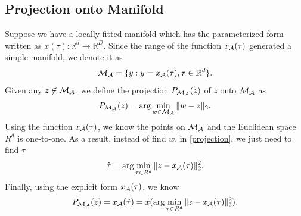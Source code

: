\documentclass[aos,preprint]{imsart}
\theoremstyle{remark}
\begin{document}
\subsection{Projection onto Manifold}
Suppose we have a locally fitted manifold which has the parameterized form written as $x(\tau): {\mathbb R}^d\rightarrow {\mathbb R}^D$.
Since the range of the function $x_{\cal A}(\tau)$ generated a simple manifold, we denote it as 
\[
{\cal M}_{\cal A} = \{y: y = x_{\cal A}(\tau), \tau\in {\mathbb R}^d\}.
\]
Given any $z\not\in{\cal M}_{\cal A}$, we define the projection $P_{{\cal M}_{\cal A}}(z)$  of $z$ onto ${\cal M}_{\cal A}$ as
\begin{equation}\label{projection}
P_{{\cal M}_{\cal A}}(z) = \arg\min_{w \in {\cal M}_{\cal A} }\|w-z\|_2.
\end{equation}
Using the function $x_{\cal A}(\tau)$, we know the points on ${\cal M}_{\cal A}$ and the Euclidean space $R^d$ is one-to-one. As a result, instead of find $w$, in \eqref{projection}, we just need to find $\tau$
\begin{equation}\label{projection_tau}
 \hat{\tau} = \arg\min_{\tau\in R^d }\|z-x_{\cal A}(\tau)\|_2^2.
\end{equation}
Finally, using the explicit form $x_{\cal A}(\tau)$, we know
\[
P_{{\cal M}_{\cal A}}(z) = x_{\cal A}(\hat{\tau})=x(\arg\min_{\tau\in R^d }\|z-x_{\cal A}(\tau)\|_2^2).
\]
\end{document}
